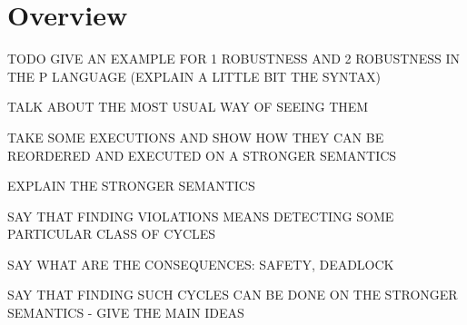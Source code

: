 \section{Overview}

TODO GIVE AN EXAMPLE FOR 1 ROBUSTNESS AND 2 ROBUSTNESS IN THE P LANGUAGE (EXPLAIN A LITTLE BIT THE SYNTAX)

TALK ABOUT THE MOST USUAL WAY OF SEEING THEM

TAKE SOME EXECUTIONS AND SHOW HOW THEY CAN BE REORDERED AND EXECUTED ON A STRONGER SEMANTICS

EXPLAIN THE STRONGER SEMANTICS

SAY THAT FINDING VIOLATIONS MEANS DETECTING SOME PARTICULAR CLASS OF CYCLES

SAY WHAT ARE THE CONSEQUENCES: SAFETY, DEADLOCK

SAY THAT FINDING SUCH CYCLES CAN BE DONE ON THE STRONGER SEMANTICS - GIVE THE MAIN IDEAS

